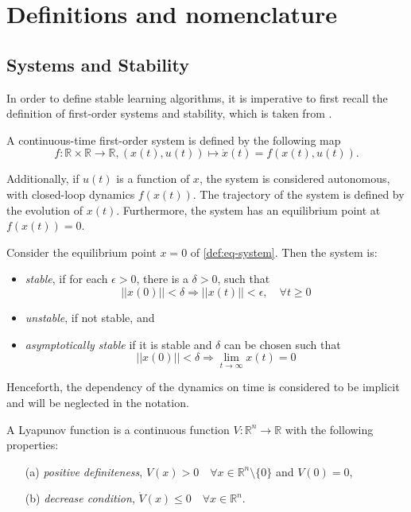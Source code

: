 \section{Definitions and nomenclature}
\label{sec:definitions}
\subsection{Systems and Stability}
In order to define stable learning algorithms, it is imperative to first recall the definition of first-order systems and stability, which is taken from \cite{khalil_nonlinear_2002}.

\begin{definition}
 A continuous-time first-order system is defined by the following map
    \begin{equation}
    f:\mathbb{R}\times\mathbb{R}\rightarrow \mathbb{R}, (x(t),u(t)) \mapsto \dot x(t) = f(x(t),u(t)).
    \label{def:eq-system}
    \end{equation}

    Additionally, if $u(t)$ is a function of $x$, the system is considered autonomous, with closed-loop dynamics $f(x(t))$. The trajectory of the system is defined by the evolution of $x(t)$. Furthermore, the system has an equilibrium point at $f(x(t))=0$.
    \label{def:system}
\end{definition}

\begin{definition}[Stability]
 Consider the equilibrium point $x=0$ of \eqref{def:eq-system}. Then the system is:
 \begin{itemize}
 \item \textit{stable}, if for each $\epsilon>0$, there is a $\delta>0$, such that
     $$||x(0)||<\delta \Rightarrow ||x(t)||<\epsilon, \quad \forall t \geq 0$$ 
 \item \textit{unstable}, if not stable, and
 \item \textit{asymptotically stable} if it is stable and $\delta$ can be chosen such that
     $$||x(0)||<\delta \Rightarrow \lim_{t\rightarrow\infty} x(t)=0 $$
 \end{itemize} 
\end{definition}
Henceforth, the dependency of the dynamics on time is considered to be implicit and will be neglected in the notation.


\begin{definition}
 A Lyapunov function is a continuous function $V: \mathbb{R}^n\rightarrow\mathbb{R}$ with the following properties:
 \begin{enumerate}
  \item[(a)] \textit{positive definiteness}, $V(x)>0 \quad \forall x\in\mathbb{R}^n\setminus\{0\}$ and $V(0)=0$,
  \item[(b)] \textit{decrease condition}, $\dot V(x)\leq0 \quad \forall x\in\mathbb{R}^n$.
 \end{enumerate}
 \label{def:lyapunov-function}
\end{definition}

